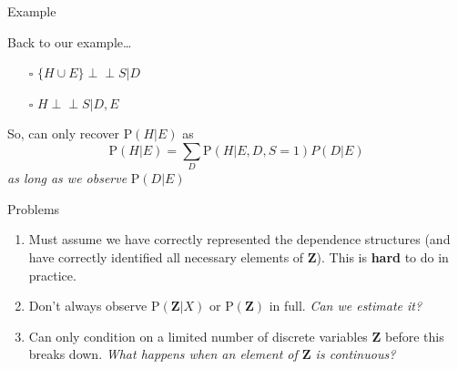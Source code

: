 \documentclass[
  ignorenonframetext,
]{beamer}
\newcommand\ci{\perp\!\!\!\perp}
\begin{document}
\begin{frame}{Example}
\protect\hypertarget{example}{}

Back to our example\ldots{}

\begin{figure}
\centering
{}
\end{figure}

\begin{itemize}
\item[\rlap{\raisebox{0.3ex}{\hspace{0.4ex}\scriptsize \textcolor{red}{\ding{56}}}}$\square$] \(\{H \cup E\} \ci S | D\)
\item[\rlap{\raisebox{0.3ex}{\hspace{0.4ex}\tiny \textcolor{green}{\ding{52}}}}$\square$] \(H \ci S | D, E\)
\end{itemize}

So, can only recover \(\text{P}(H | E)\) as
\[\text{P}(H | E) = \sum_D\text{P}(H | E, D, S = 1) P (D|E)\] \emph{as
long as we observe} \(\text{P}(D | E)\)

\end{frame}

\begin{frame}{Problems}
\protect\hypertarget{problems}{}

\begin{enumerate}
\item
  Must assume we have correctly represented the dependence structures
  (and have correctly identified all necessary elements of
  \(\mathbf{Z}\)). This is \textbf{hard} to do in practice.
\item
  Don't always observe \(\text{P}(\mathbf{Z} | X)\) or
  \(\text{P}(\mathbf{Z})\) in full. \emph{Can we estimate it?}
\item
  Can only condition on a limited number of discrete variables
  \(\mathbf{Z}\) before this breaks down. \emph{What happens when an
  element of \(\mathbf{Z}\) is continuous?}
\end{enumerate}

\end{frame}
\end{document}
